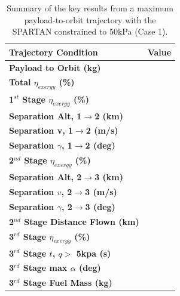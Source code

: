 \begin{table}[ht]
	\centering
	
	\begin{tabular}{l c } 
		\hline \textbf{Trajectory Condition}
		&Value
		\\
		\hline \textbf{Payload to Orbit (kg)}
		& \textbf{\PayloadToOrbitConstqNoReturn}
		\\
		\textbf{Total $\eta_{exergy}$ (\%)}
		& \textbf{\totalExergyEffConstqNoReturn}
		\\
		\hline 
		\textbf{1$^{st}$ Stage $\eta_{exergy}$ (\%)}
		& \textbf{\firstExergyEffConstqNoReturn}
		\\
	
		\textbf{Separation Alt, 1$\rightarrow$2 (km)}
		& \firstsecondSeparationAltConstqNoReturn
		\\
		\textbf{Separation v, 1$\rightarrow$2 (m/s)}
		& \firstsecondSeparationvConstqNoReturn
		\\
		\textbf{Separation $\gamma$, 1$\rightarrow$2 (deg)}
		& \firstsecondSeparationgammaConstqNoReturn
		\\
		\hline 
		\textbf{2$^{nd}$ Stage $\eta_{exergy}$ (\%)}
		& \textbf{\secondExergyEffConstqNoReturn}
		\\
		\textbf{Separation Alt, 2$\rightarrow$3 (km)}
		& \secondthirdSeparationAltConstqNoReturn
		\\
		\textbf{Separation $v$, 2$\rightarrow$3 (m/s)}
		& \secondthirdSeparationvConstqNoReturn
		\\
		\textbf{Separation $\gamma$, 2$\rightarrow$3 (deg)}
		& \secondthirdSeparationgammaConstqNoReturn
		\\
		\textbf{2$^{nd}$ Stage Distance Flown (km)}
		& \SecondDistConstqNoReturn
		\\
		\hline 
		\textbf{3$^{rd}$ Stage $\eta_{exergy}$ (\%)}
		& \textbf{\thirddExergyEffConstqNoReturn}
		\\
	
		\textbf{3$^{rd}$ Stage $t$, $q >$ 5kpa (s)}
		& \thirdqOverFiveConstqNoReturn
		\\
		\textbf{3$^{rd}$ Stage max $\alpha$ (deg)}
		& \thirdmaxAoAConstqNoReturn
		\\
		\textbf{3$^{rd}$ Stage Fuel Mass (kg)}
		& \thirdmFuelConstqNoReturn
		\\
		\hline 
	\end{tabular} 
	
	\caption{Summary of the key results from a maximum payload-to-orbit trajectory with the SPARTAN constrained to 50kPa (Case 1).}
	\label{tab:constqsummary}
\end{table}
